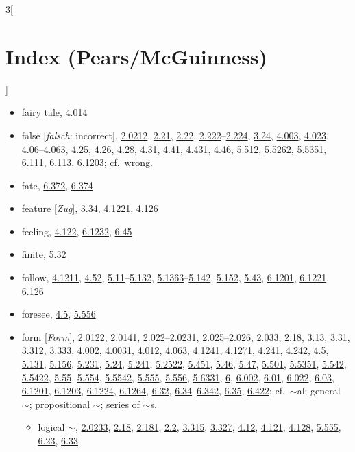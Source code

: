 \documentclass[oneside,openany,12pt]{book}
\newcommand{\indexentry}[1]{\item #1}
\newcommand{\indexsubentry}[1]{\begin{itemize} \item #1 \end{itemize}}
\newcommand{\indexref}[1]{\hyperlink{prop#1}{#1}}
\begin{document}
\begin{multicols}{3}[\section*{Index (Pears/McGuinness)}]
\begin{itemize}
\indexentry{fairy tale, \indexref{4.014}}

\indexentry{false [\textit{falsch}: incorrect], \indexref{2.0212}, \indexref{2.21}, \indexref{2.22}, \indexref{2.222}--\indexref{2.224}, \indexref{3.24}, \indexref{4.003}, \indexref{4.023}, \indexref{4.06}--\indexref{4.063}, \indexref{4.25}, \indexref{4.26}, \indexref{4.28}, \indexref{4.31}, \indexref{4.41}, \indexref{4.431}, \indexref{4.46}, \indexref{5.512}, \indexref{5.5262}, \indexref{5.5351}, \indexref{6.111}, \indexref{6.113}, \indexref{6.1203}; cf.\ wrong.}

\indexentry{fate, \indexref{6.372}, \indexref{6.374}}

\indexentry{feature [\textit{Zug}], \indexref{3.34}, \indexref{4.1221}, \indexref{4.126}}

\indexentry{feeling, \indexref{4.122}, \indexref{6.1232}, \indexref{6.45}}

\indexentry{finite, \indexref{5.32}}

\indexentry{follow, \indexref{4.1211}, \indexref{4.52}, \indexref{5.11}--\indexref{5.132}, \indexref{5.1363}--\indexref{5.142}, \indexref{5.152}, \indexref{5.43}, \indexref{6.1201}, \indexref{6.1221}, \indexref{6.126}}

\indexentry{foresee, \indexref{4.5}, \indexref{5.556}}

\indexentry{form [\textit{Form}], \indexref{2.0122}, \indexref{2.0141}, \indexref{2.022}--\indexref{2.0231}, \indexref{2.025}--\indexref{2.026}, \indexref{2.033}, \indexref{2.18}, \indexref{3.13}, \indexref{3.31}, \indexref{3.312}, \indexref{3.333}, \indexref{4.002}, \indexref{4.0031}, \indexref{4.012}, \indexref{4.063}, \indexref{4.1241}, \indexref{4.1271}, \indexref{4.241}, \indexref{4.242}, \indexref{4.5}, \indexref{5.131}, \indexref{5.156}, \indexref{5.231}, \indexref{5.24}, \indexref{5.241}, \indexref{5.2522}, \indexref{5.451}, \indexref{5.46}, \indexref{5.47}, \indexref{5.501}, \indexref{5.5351}, \indexref{5.542}, \indexref{5.5422}, \indexref{5.55}, \indexref{5.554}, \indexref{5.5542}, \indexref{5.555}, \indexref{5.556}, \indexref{5.6331}, \indexref{6}, \indexref{6.002}, \indexref{6.01}, \indexref{6.022}, \indexref{6.03}, \indexref{6.1201}, \indexref{6.1203}, \indexref{6.1224}, \indexref{6.1264}, \indexref{6.32}, \indexref{6.34}--\indexref{6.342}, \indexref{6.35}, \indexref{6.422}; cf.\ $\sim$al; general $\sim$; propositional $\sim$; series of $\sim$s.}

   \indexsubentry{logical $\sim$, \indexref{2.0233}, \indexref{2.18}, \indexref{2.181}, \indexref{2.2}, \indexref{3.315}, \indexref{3.327}, \indexref{4.12}, \indexref{4.121}, \indexref{4.128}, \indexref{5.555}, \indexref{6.23}, \indexref{6.33}}


\end{itemize}
\end{multicols}
\end{document}
